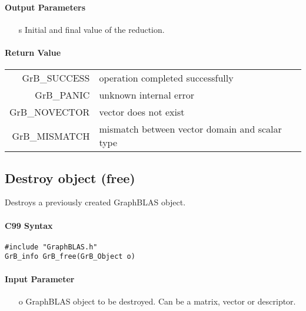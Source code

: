 \documentclass[11pt]{extarticle}
\begin{document}
\paragraph{Output Parameters}

\begin{itemize}
	\item[{\sf s}] Initial and final value of the reduction.
\end{itemize}

\paragraph{Return Value}

\begin{tabular}{rl}
{\sf GrB\_SUCCESS}	& operation completed successfully \\
{\sf GrB\_PANIC}	& unknown internal error \\
{\sf GrB\_NOVECTOR}	& vector does not exist \\
{\sf GrB\_MISMATCH}	& mismatch between vector domain and scalar type \\
\end{tabular}

\subsection{Destroy object ({\sf free})}

Destroys a previously created GraphBLAS object.

\paragraph{C99 Syntax}

\begin{verbatim}
#include "GraphBLAS.h"
GrB_info GrB_free(GrB_Object o)
\end{verbatim}


\paragraph{Input Parameter}

\begin{itemize}
	\item[{\sf o}] GraphBLAS object to be destroyed. Can be a matrix, vector or descriptor.
\end{itemize}
\end{document}
